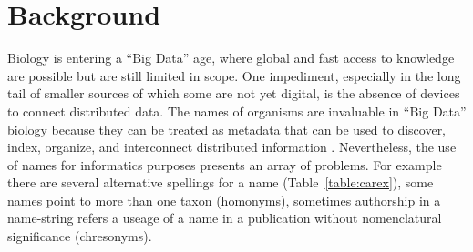 \documentclass{bmcart}
\begin{document}
\section*{Background}

Biology is entering a ``Big Data'' age, where global and fast access to
knowledge are possible but are still limited in scope. One impediment, especially in the long tail of smaller sources of which some are not yet digital, is the absence of devices to connect distributed data.  The names of organisms are invaluable in ``Big
Data'' biology because they can be treated as metadata that can be used to discover, index, organize, and
interconnect distributed information \cite{Patterson2010}.  Nevertheless, the use
of names for informatics purposes presents an array of problems. For example
there are several alternative spellings for a name (Table~\ref{table:carex}),
some names point to more than one taxon (homonyms), sometimes authorship in a
name-string refers a useage of a name in a publication without nomenclatural significance (chresonyms).
\end{document}
